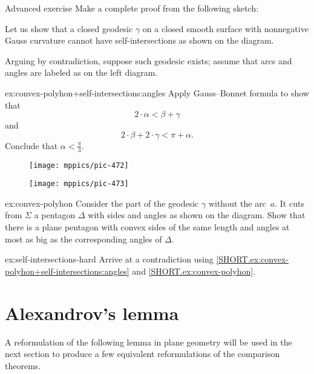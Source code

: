 \begin{thm}{Advanced exercise}\label{ex:convex-polyhon+self-intersections}
Make a complete proof from the following sketch:

Let us show that a closed geodesic $\gamma$ on a closed smooth surface with nonnegative Gauss curvature cannot have self-intersections as shown on the diagram.

Arguing by contradiction, suppose such geodesic exists;
assume that arcs and angles are labeled as on the left diagram.

\begin{subthm}{ex:convex-polyhon+self-intersections:angles}
Apply Gauss--Bonnet formula to show that
\[2\cdot\alpha<\beta+\gamma\]
and 
\[2\cdot\beta+2\cdot \gamma<\pi+\alpha.\]
Conclude that $\alpha <\tfrac \pi 3$.
\end{subthm}

\begin{figure}[!ht]
\begin{minipage}{.38\textwidth}
\centering
\texttt{[image: mppics/pic-472]}
\end{minipage}\hfill
\begin{minipage}{.58\textwidth}
\centering
\texttt{[image: mppics/pic-473]}
\end{minipage}
\end{figure}

\begin{subthm}{ex:convex-polyhon}
Consider the part of the geodesic $\gamma$ without the arc~$a$.
It cuts from $\Sigma$ a pentagon $\Delta$ with sides and angles as shown on the diagram. 
Show that there is a plane pentagon with convex sides of the same length and angles at most as big as the corresponding angles of $\Delta$.
\end{subthm}

\begin{subthm}{ex:self-intersections-hard}
Arrive at a contradiction using \ref{SHORT.ex:convex-polyhon+self-intersections:angles} and \ref{SHORT.ex:convex-polyhon}. 
\end{subthm}

\end{thm}

\section{Alexandrov's lemma}

A reformulation of the following lemma in plane geometry will be used in the next section to produce a few equivalent reformulations of the comparison theorems.


